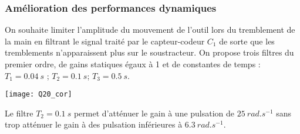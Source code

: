 \begin{multicols}{2}
\subsubsection*{Amélioration des performances dynamiques}
\ifprof
\else
On souhaite limiter l’amplitude du mouvement de l’outil lors du tremblement de la main en  filtrant le signal traité par le capteur-codeur $C_1$ de sorte que les tremblements n’apparaissent plus sur le soustracteur. On propose trois filtres du premier ordre, de gains statiques égaux à 1 et de constantes de temps :	 $T_1 = \SI{0,04}{s}$ ; $T_2 = \SI{0,1}{s}$; $T_3 = \SI{0,5}{s}$.
\fi


\ifprof
\begin{center}
\texttt{[image: Q20\_cor]}
\end{center}
\begin{corrige}
Le filtre $T_2 = \SI{0,1}{s}$ permet d'atténuer le gain à une pulsation de $\SI{25}{rad.s^{-1}}$ sans trop atténuer le gain à des pulsation inférieures à $\SI{6,3}{rad.s^{-1}}$.
\end{corrige}
\else
\fi
%
%
%

\end{multicols}
%
%
%
%
%
%
